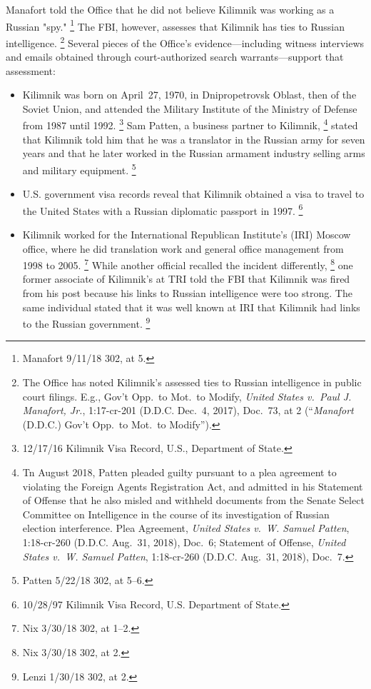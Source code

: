 Manafort told the Office that he did not believe Kilimnik was working as a Russian "spy."%
\footnote{Manafort 9/11/18 302, at 5.}
The FBI, however, assesses that Kilimnik has ties to Russian intelligence.%
\footnote{The Office has noted Kilimnik's assessed ties to Russian intelligence in public court filings.
E.g., Gov't Opp.\ to Mot.\ to Modify, \textit{United States v.\ Paul J. Manafort, Jr.}, 1:17-cr-201 (D.D.C. Dec.~4, 2017), Doc.~73, at 2 (“\textit{Manafort} (D.D.C.) Gov't Opp.\ to Mot.\ to Modify”).}
Several pieces of the Office's evidence---including witness interviews and emails obtained through court-authorized search warrants---support that assessment:

\begin{itemize}

    \item Kilimnik was born on April~27, 1970, in Dnipropetrovsk Oblast, then of the Soviet Union, and attended the Military Institute of the Ministry of Defense from 1987 until 1992.%
\footnote{12/17/16 Kilimnik Visa Record, U.S., Department of State.}
    Sam Patten, a business partner to Kilimnik,%
\footnote{Tn August 2018, Patten pleaded guilty pursuant to a plea agreement to violating the Foreign Agents Registration Act, and admitted in his Statement of Offense that he also misled and withheld documents from the Senate Select Committee on Intelligence in the course of its investigation of Russian election interference.
Plea Agreement, \textit{United States v.\ W. Samuel Patten}, 1:18-cr-260 (D.D.C. Aug.~31, 2018), Doc.~6;
Statement of Offense, \textit{United States v.\ W. Samuel Patten}, 1:18-cr-260 (D.D.C. Aug.~31, 2018), Doc.~7.}
    stated that Kilimnik told him that he was a translator in the Russian army for seven years and that he later worked in the Russian armament industry selling arms and military equipment.%
\footnote{Patten 5/22/18 302, at 5--6.}

    \item U.S. government visa records reveal that Kilimnik obtained a visa to travel to the United States with a Russian diplomatic passport in 1997.%
\footnote{10/28/97 Kilimnik Visa Record, U.S. Department of State.}

    \item Kilimnik worked for the International Republican Institute's (IRI) Moscow office, where he did translation work and general office management from 1998 to 2005.%
\footnote{Nix 3/30/18 302, at 1--2.}
    While another official recalled the incident differently,%
\footnote{Nix 3/30/18 302, at 2.}
    one former associate of Kilimnik's at TRI told the FBI that Kilimnik was fired from his post because his links to Russian intelligence were too strong.
    The same individual stated that it was well known at IRI that Kilimnik had links to the Russian government.%
\footnote{Lenzi 1/30/18 302, at 2.}


\end{itemize}
